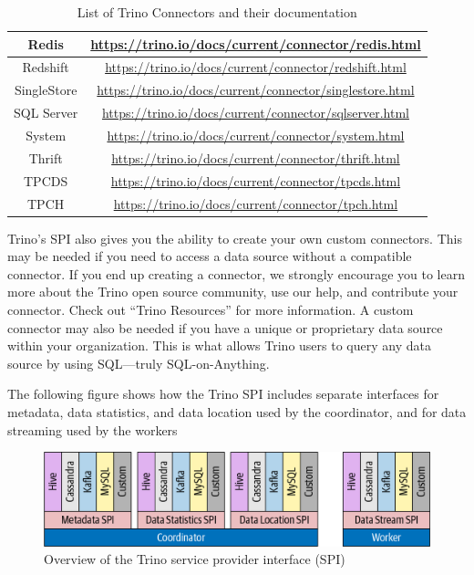 \begin{table}[ht]
\begin{tabular}{|c|c|}
	Redis & \href{https://trino.io/docs/current/connector/redis.html}{https://trino.io/docs/current/connector/redis.html} \\ \hline
	Redshift & \href{https://trino.io/docs/current/connector/redshift.html}{https://trino.io/docs/current/connector/redshift.html} \\ \hline
	SingleStore & \href{https://trino.io/docs/current/connector/singlestore.html}{https://trino.io/docs/current/connector/singlestore.html} \\ \hline
	SQL Server & \href{https://trino.io/docs/current/connector/sqlserver.html}{https://trino.io/docs/current/connector/sqlserver.html} \\ \hline
	System & \href{https://trino.io/docs/current/connector/system.html}{https://trino.io/docs/current/connector/system.html} \\ \hline
	Thrift & \href{https://trino.io/docs/current/connector/thrift.html}{https://trino.io/docs/current/connector/thrift.html} \\ \hline
	TPCDS & \href{https://trino.io/docs/current/connector/tpcds.html}{https://trino.io/docs/current/connector/tpcds.html} \\ \hline
	TPCH & \href{https://trino.io/docs/current/connector/tpch.html}{https://trino.io/docs/current/connector/tpch.html} \\ \hline
\end{tabular}
\caption{List of Trino Connectors and their documentation}
\end{table}

Trino’s SPI also gives you the ability to create your own custom connectors. This may be needed if you need to access a data source without a compatible connector. If you end up creating a connector, we strongly encourage you to learn more about the Trino open source community, use our help, and contribute your connector. Check out “Trino Resources” for more information. A custom connector may also be needed if you have a unique or proprietary data source within your organization. This is what allows Trino users to query any data source by using SQL—truly SQL-on-Anything.

The following figure shows how the Trino SPI includes separate interfaces for metadata, data statistics, and data location used by the coordinator, and for data streaming used by the workers

\begin{figure}[htbp]
\centering
\includegraphics[width=\linewidth]{images/trino_connector.png}
\caption{Overview of the Trino service provider interface (SPI)}\label{fig:trino-connector}
\end{figure}

